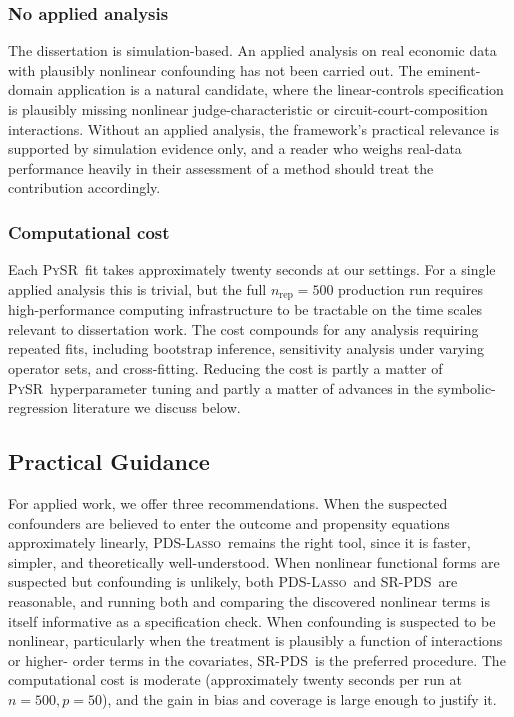 \documentclass[11pt, a4paper]{article}
\theoremstyle{plain}
\theoremstyle{definition}
\theoremstyle{remark}
\newcommand{\lasso}{\textsc{Lasso}}
\newcommand{\pds}{\textsc{PDS}}
\newcommand{\pysr}{\textsc{PySR}}
\newcommand{\epds}{\textsc{SR-PDS}}
\begin{document}
\subsubsection{No applied analysis}

The dissertation is simulation-based. An applied analysis on real economic data with
plausibly nonlinear confounding has not been carried out. The
\citet{bch2014} eminent-domain application is a natural
candidate, where the linear-controls specification is
plausibly missing nonlinear judge-characteristic or
circuit-court-composition interactions. Without an applied
analysis, the framework's practical relevance is supported by
simulation evidence only, and a reader who weighs real-data
performance heavily in their assessment of a method should
treat the contribution accordingly.

\subsubsection{Computational cost}

Each \pysr\ fit takes
approximately twenty seconds at our settings. For a single
applied analysis this is trivial, but the full $n_{\text{rep}}
= 500$ production run requires high-performance computing
infrastructure to be tractable on the time scales relevant to
dissertation work. The cost compounds for any analysis
requiring repeated fits, including bootstrap inference,
sensitivity analysis under varying operator sets, and
cross-fitting. Reducing the cost is partly a matter of \pysr\
hyperparameter tuning and partly a matter of advances in the
symbolic-regression literature we discuss below.

\subsection{Practical Guidance}

For applied work, we offer three recommendations. When the
suspected confounders are believed to enter the outcome and
propensity equations approximately linearly, \pds-\lasso\
remains the right tool, since it is faster, simpler, and
theoretically well-understood. When nonlinear functional forms are suspected
but confounding is unlikely, both \pds-\lasso\ and \epds\ are
reasonable, and running both and comparing the discovered
nonlinear terms is itself informative as a specification check.
When confounding is suspected to be nonlinear, particularly when
the treatment is plausibly a function of interactions or higher-%
order terms in the covariates, \epds\ is the preferred procedure.
The computational cost is moderate
(approximately twenty seconds per run at $n=500, p=50$), and the
gain in bias and coverage is large enough to justify it.
\end{document}
